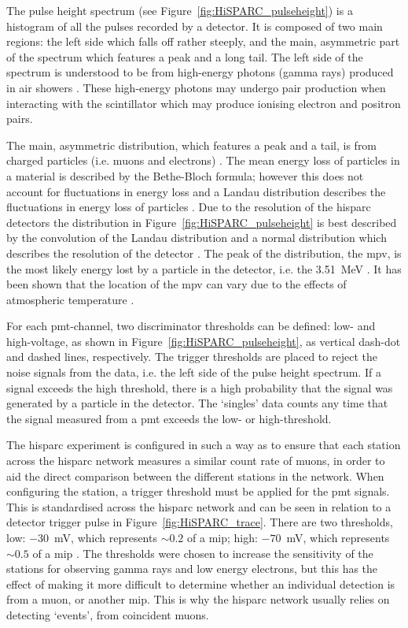 The pulse height spectrum (see Figure~\ref{fig:HiSPARC_pulseheight}) is a histogram of all the pulses recorded by a detector. It is composed of two main regions: the left side which falls off rather steeply, and the main, asymmetric part of the spectrum which features a peak and a long tail. The left side of the spectrum is understood to be from high-energy photons (gamma rays) produced in air showers \citep{fokkema_hisparc_2012}. These high-energy photons may undergo pair production when interacting with the scintillator which may produce ionising electron and positron pairs.

The main, asymmetric distribution, which features a peak and a tail, is from charged particles (i.e. muons and electrons) \citep{van_dam_hisparc_2020}. The mean energy loss of particles in a material is described by the Bethe-Bloch formula; however this does not account for fluctuations in energy loss and a Landau distribution describes the fluctuations in energy loss of particles \citep{fokkema_hisparc_2012}. Due to the resolution of the \gls{hisparc} detectors the distribution in Figure~\ref{fig:HiSPARC_pulseheight} is best described by the convolution of the Landau distribution and a normal distribution which describes the resolution of the detector \citep{fokkema_hisparc_2012}. The peak of the distribution, the \gls{mpv}, is the most likely energy lost by a particle in the detector, i.e. the 3.51~MeV \citep{van_dam_hisparc_2020}. It has been shown that the location of the \gls{mpv} can vary due to the effects of atmospheric temperature \citep{bartels_hisparc_2012, van_dam_hisparc_2020}.

For each \gls{pmt}-channel, two discriminator thresholds can be defined: low- and high-voltage, as shown in Figure~\ref{fig:HiSPARC_pulseheight}, as vertical dash-dot and dashed lines, respectively.  The trigger thresholds are placed to reject the noise signals from the data, i.e. the left side of the pulse height spectrum. If a signal exceeds the high threshold, there is a high probability that the signal was generated by a particle in the detector. The `singles' data counts any time that the signal measured from a \gls{pmt} exceeds the low- or high-threshold.

The \gls{hisparc} experiment is configured in such a way as to ensure that each station across the \gls{hisparc} network measures a similar count rate of muons, in order to aid the direct comparison between the different stations in the network. When configuring the station, a trigger threshold must be applied for the \gls{pmt} signals. This is standardised across the \gls{hisparc} network and can be seen in relation to a detector trigger pulse in Figure~\ref{fig:HiSPARC_trace}. There are two thresholds, low: $-30$~mV, which represents $\sim0.2$ of a \gls{mip}; high: $-70$~mV, which represents $\sim0.5$ of a \gls{mip} \citep{fokkema_hisparc_2012, van_dam_hisparc_2020}. The thresholds were chosen to increase the sensitivity of the stations for observing gamma rays and low energy electrons, but this has the effect of making it more difficult to determine whether an individual detection is from a muon, or another \gls{mip}. This is why the \gls{hisparc} network usually relies on detecting `events', from coincident muons.

